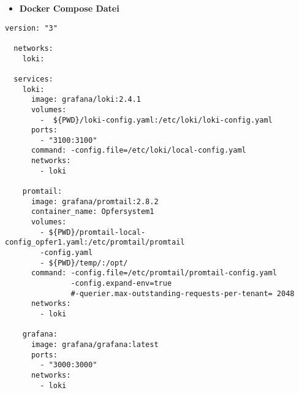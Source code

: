 \newpage
\begin{itemize}[noitemsep]
    \item \textbf{Docker Compose Datei} 
\end{itemize}

{
\begin{Verbatim}[frame=single]
  version: "3"

  networks:
    loki:
  
  services:
    loki:
      image: grafana/loki:2.4.1
      volumes:
        -  ${PWD}/loki-config.yaml:/etc/loki/loki-config.yaml
      ports:
        - "3100:3100"
      command: -config.file=/etc/loki/local-config.yaml
      networks:
        - loki
  
    promtail:
      image: grafana/promtail:2.8.2
      container_name: Opfersystem1
      volumes:
        - ${PWD}/promtail-local-config_opfer1.yaml:/etc/promtail/promtail
        -config.yaml
        - ${PWD}/temp/:/opt/
      command: -config.file=/etc/promtail/promtail-config.yaml 
               -config.expand-env=true 
               #-querier.max-outstanding-requests-per-tenant= 2048
      networks:
        - loki
  
    grafana:
      image: grafana/grafana:latest
      ports:
        - "3000:3000"
      networks:
        - loki  
\end{Verbatim}
}